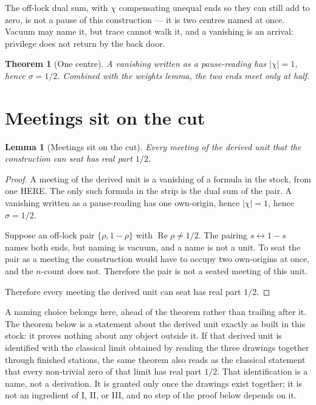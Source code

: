 \documentclass[10pt,a4paper]{article}
\theoremstyle{plain}
\newtheorem{lemma}{Lemma}
\newtheorem{theorem}{Theorem}
\theoremstyle{definition}
\theoremstyle{remark}
\begin{document}
The off-lock dual sum, with $\chi$ compensating unequal ends so they can still add to zero, is not a pause of this construction --- it is two centres named at once.
Vacuum may name it, but trace cannot walk it, and a vanishing is an arrival: privilege does not return by the back door.

\begin{theorem}[One centre]
A vanishing written as a pause-reading has $\lvert\chi\rvert=1$, hence $\sigma=1/2$.
Combined with the weights lemma, the two ends meet only at half.
\end{theorem}

\section{Meetings sit on the cut}

\begin{lemma}[Meetings sit on the cut]
Every meeting of the derived unit that the construction can seat has real part $1/2$.
\end{lemma}

\begin{proof}
A meeting of the derived unit is a vanishing of a formula in the stock, from one HERE.
The only such formula in the strip is the dual sum of the pair.
A vanishing written as a pause-reading has one own-origin, hence $\lvert\chi\rvert=1$, hence $\sigma=1/2$.

Suppose an off-lock pair $\{\rho,1-\rho\}$ with $\operatorname{Re}\rho\neq 1/2$.
The pairing $s\leftrightarrow 1-s$ names both ends, but naming is vacuum, and a name is not a unit.
To seat the pair as a meeting the construction would have to occupy two own-origins at once, and the $n$-count does not.
Therefore the pair is not a seated meeting of this unit.

Therefore every meeting the derived unit can seat has real part $1/2$.
\end{proof}

A naming choice belongs here, ahead of the theorem rather than trailing after it.
The theorem below is a statement about the derived unit exactly as built in this stock: it proves nothing about any object outside it.
If that derived unit is identified with the classical limit obtained by reading the three drawings together through finished stations, the same theorem also reads as the classical statement that every non-trivial zero of that limit has real part $1/2$.
That identification is a name, not a derivation.
It is granted only once the drawings exist together; it is not an ingredient of I, II, or III, and no step of the proof below depends on it.
\end{document}
